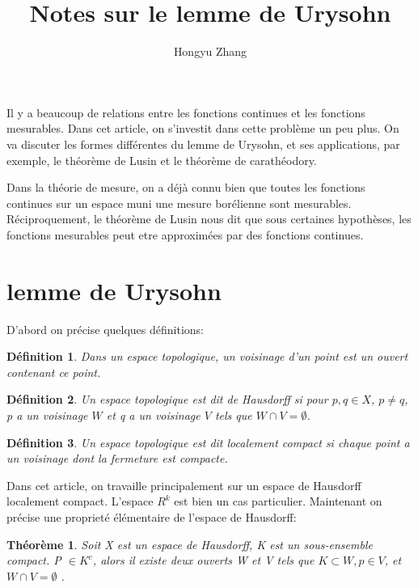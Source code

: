 \documentclass{article}
\title{Notes sur le lemme de Urysohn}
\author{Hongyu Zhang}
\newtheorem{theorem}{Théorème}[section]
\newtheorem{definition}{Définition}[section]
\begin{document}
\maketitle

Il y a beaucoup de relations entre les fonctions continues et les fonctions mesurables. Dans cet article, on s'investit dans cette problème un peu plus. On va discuter les formes différentes du lemme de Urysohn, et ses applications, par exemple, le théorème de Lusin et le théorème de carathéodory.\par
Dans la théorie de mesure, on a déjà connu bien que toutes les fonctions continues sur un espace muni une mesure borélienne sont mesurables. Réciproquement, le théorème de Lusin nous dit que sous certaines hypothèses, les fonctions mesurables peut etre approximées par des fonctions continues. \par

\section{lemme de Urysohn}

D'abord on précise quelques définitions:
\begin{definition}
    Dans un espace topologique, un voisinage d'un point est un ouvert contenant ce point.
\end{definition}

\begin{definition}
     Un espace topologique est dit de Hausdorff si pour $p, q \in X$, $p \neq q$, p a un voisinage $W$ et q a un voisinage $V$ tels que $W \cap V = \emptyset$.
\end{definition}

\begin{definition}
    Un espace topologique est dit localement compact si chaque point a un voisinage dont la fermeture est compacte.
\end{definition}

Dans cet article, on travaille principalement sur un espace de Hausdorff localement compact. L'espace $R^{k}$ est bien un cas particulier. Maintenant on précise une proprieté élémentaire de l'espace de Hausdorff:

\begin{theorem}
    Soit X est un espace de Hausdorff, K est un sous-ensemble compact. P $\in K^{c}$, alors il existe deux ouverts W et V tels que $K \subset W, p \in V$, et $W \cap V= \emptyset $ .  
\end{theorem}
\end{document}
